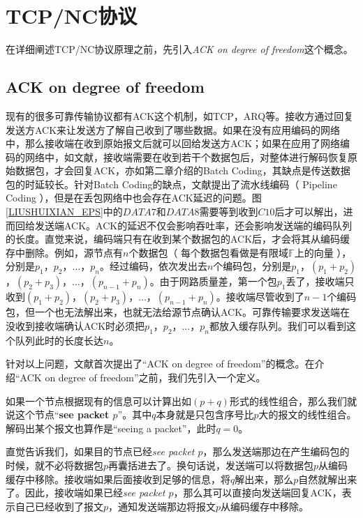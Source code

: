 \section{TCP/NC协议}
在详细阐述TCP/NC协议原理之前，先引入\emph{ACK on degree of freedom}这个概念。
\par
\subsection{ACK on degree of freedom}\label{ackondegree}
现有的很多可靠传输协议都有ACK这个机制，如TCP，ARQ等。接收方通过回复发送方ACK来让发送方了解自己收到了哪些数据。如果在没有应用编码的网络中，那么接收端在收到原始报文后就可以回给发送方ACK；如果在应用了网络编码的网络中，如文献\cite{Lun2008On}，接收端需要在收到若干个数据包后，对整体进行解码恢复原始数据包，才会回复ACK，亦如第二章介绍的Batch Coding，其缺点是传送数据包的时延较长。针对Batch Coding的缺点，文献\cite{chen2010pipeline}提出了流水线编码（ Pipeline  Coding ），但是在丢包网络中也会存在ACK延迟的问题。图\ref{LIUSHUIXIAN_EPS}中的$DATA7$和$DATA8$需要等到收到$C10$后才可以解出，进而回给发送端ACK。ACK的延迟不仅会影响吞吐率，还会影响发送端的编码队列的长度。直觉来说，编码端只有在收到某个数据包的ACK后，才会将其从编码缓存中删除。例如，源节点有$n$个数据包（ 每个数据包看做是有限域$\mathbb{F}$上的向量 ），分别是$p_{1}$，$p_{2}$，$\dots$，$p_{n}$。经过编码，依次发出去$n$个编码包，分别是$p_{1}$，$\left(p_{1}+p_{2}\right)$，$\left(p_{2}+p_{3}\right)$，$\dots$，$\left(p_{n-1}+p_{n}\right)$。由于网路质量差，第一个包$p_{1}$丢了，接收端只收到$\left(p_{1}+p_{2}\right)$，$\left(p_{2}+p_{3}\right)$，$\dots$，$\left(p_{n-1}+p_{n}\right)$。接收端尽管收到了$n-1$个编码包，但一个也无法解出来，也就无法给源节点确认ACK。可靠传输要求发送端在没收到接收端确认ACK时必须把$p_{1}$，$p_{2}$，$\dots$，$p_{n}$都放入缓存队列。我们可以看到这个队列此时的长度长达$n$。
\par
针对以上问题，文献\cite{4595268}首次提出了“ACK on degree of freedom”的概念。在介绍“ACK on degree of freedom”之前，我们先引入一个定义。
\begin{myDef}\label{df26}
	如果一个节点根据现有的信息可以计算出如\textbf{\emph{$\left(p+q\right)$}}形式的线性组合，那么我们就说这个节点“\textbf{see packet \emph{$p$}}”。其中\textbf{$q$}本身就是只包含序号比$p$大的报文的线性组合。解码出某个报文也算作是“seeing a packet”，此时\textbf{$q=0$}。

\end{myDef}
\par
直觉告诉我们，如果目的节点已经\emph{see packet $p$}，那么发送端那边在产生编码包的时候，就不必将数据包$p$再囊括进去了。换句话说，发送端可以将数据包$p$从编码缓存中移除。接收端如果后面接收到足够的信息，将$q$解出来，那么$p$自然就解出来了。因此，接收端如果已经\emph{see packet $p$}，那么其可以直接向发送端回复ACK，表示自己已经收到了报文$p$，通知发送端那边将报文$p$从编码缓存中移除。

